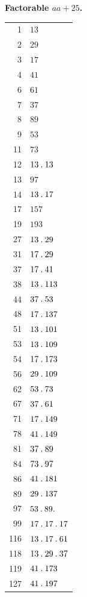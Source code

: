 %
\par{}
\begin{center}\textbf{Factorable $aa+25$.}\end{center}
\begingroup\small\setlength{\tabcolsep}{5pt}
\begin{longtable}{@{}r|l@{}}
1 & $13$\\
2 & $29$\\
3 & $17$\\
4 & $41$\\
6 & $61$\\
7 & $37$\\
8 & $89$\\
9 & $53$\\
11 & $73$\\
12 & $13\mathbin{.} 13$\\
13 & $97$\\
14 & $13\mathbin{.} 17$\\
17 & $157$\\
19 & $193$\\
27 & $13\mathbin{.} 29$\\
31 & $17\mathbin{.} 29$\\
37 & $17\mathbin{.} 41$\\
38 & $13\mathbin{.} 113$\\
44 & $37\mathbin{.} 53$\\
48 & $17\mathbin{.} 137$\\
51 & $13\mathbin{.} 101$\\
53 & $13\mathbin{.} 109$\\
54 & $17\mathbin{.} 173$\\
56 & $29\mathbin{.} 109$\\
62 & $53\mathbin{.} 73$\\
67 & $37\mathbin{.} 61$\\
71 & $17\mathbin{.} 149$\\
78 & $41\mathbin{.} 149$\\
81 & $37\mathbin{.} 89$\\
84 & $73\mathbin{.} 97$\\
86 & $41\mathbin{.} 181$\\
89 & $29\mathbin{.} 137$\\
97 & $53\mathbin{.} 89\mathbin{.} $\\
99 & $17\mathbin{.} 17\mathbin{.} 17$\\
116 & $13\mathbin{.} 17\mathbin{.} 61$\\
118 & $13\mathbin{.} 29\mathbin{.} 37$\\
119 & $41\mathbin{.} 173$\\
127 & $41\mathbin{.} 197$\\

\end{longtable}
